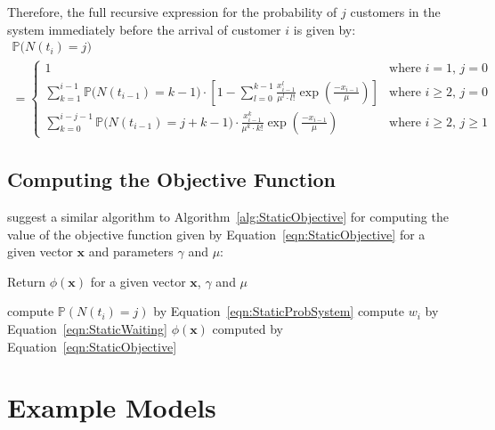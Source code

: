Therefore, the full recursive expression for the probability of $j$ customers in the system immediately before the arrival of customer $i$ is given by:
\begin{multline}
	\mathbb{P} \Big( N (t_{i}) = j \Big) \\
	= \begin{cases} 1 & \text{where $i = 1$, $j = 0$} \\ \sum_{k = 1}^{i - 1} \mathbb{P} \Big( N (t_{i - 1}) = k - 1 \Big) \cdot \left[ 1 - \sum_{l = 0}^{k - 1} \frac{x_{i - 1}^{l}}{\mu^{l} \cdot l!} \exp \left( \frac{- x_{i - 1}}{\mu} \right) \right] & \text{where $i \geq 2$, $j = 0$} \\ \sum_{k = 0}^{i - j - 1} \mathbb{P} \Big( N (t_{i - 1}) = j + k - 1 \Big) \cdot \frac{x_{i - 1}^{k}}{\mu^{k} \cdot k!} \exp \left( \frac{- x_{i - 1}}{\mu} \right) & \text{where $i \geq 2$, $j \geq 1$} \end{cases}
	\label{eqn:StaticProbSystem}
\end{multline}

\subsection{Computing the Objective Function}

\citet{Pegden} suggest a similar algorithm to Algorithm~\ref{alg:StaticObjective} for computing the value of the objective function given by Equation~\ref{eqn:StaticObjective} for a given vector $\mathbf{x}$ and parameters $\gamma$ and $\mu$:
\begin{algorithm}[htb]
\caption{Return $\phi (\mathbf{x})$ for a given vector $\mathbf{x}$, $\gamma$ and $\mu$}
\begin{algorithmic}
    		\State compute $\mathbb{P} \left( N (t_{i}) = j \right)$ by Equation~\ref{eqn:StaticProbSystem}
    	\EndFor
    \EndFor
    	\State compute $w_{i}$ by Equation~\ref{eqn:StaticWaiting}
    \EndFor
    \State \Return $\phi (\mathbf{x})$ computed by Equation~\ref{eqn:StaticObjective}
\EndFunction
\end{algorithmic}
\label{alg:StaticObjective}
\end{algorithm}

\section{Example Models}
